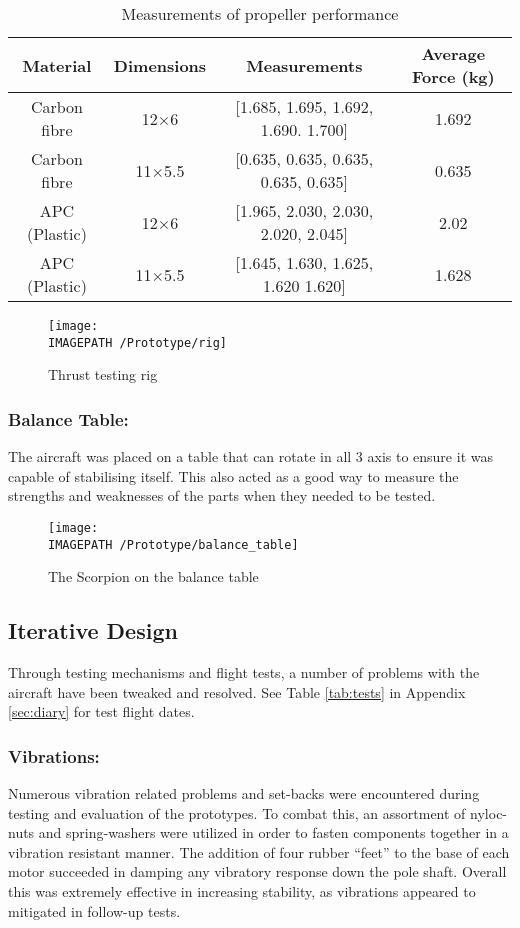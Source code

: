 \begin{table}[!htbp]
	\centering
	\caption{Measurements of propeller performance}
	\begin{tabular}{|c|c|c|c|}
		\hline Material & Dimensions & Measurements & Average Force (kg) \\ 
		\hline Carbon fibre & 12$\times$6 & [1.685, 1.695, 1.692, 1.690. 1.700] & 1.692 \\ 
		\hline Carbon fibre & 11$\times$5.5 & [0.635, 0.635, 0.635, 0.635, 0.635] & 0.635 \\ 
		\hline APC (Plastic) & 12$\times$6 & [1.965, 2.030, 2.030, 2.020, 2.045] & 2.02 \\ 
		\hline APC (Plastic) & 11$\times$5.5 & [1.645, 1.630, 1.625, 1.620 1.620] & 1.628 \\ 
		\hline 
	\end{tabular} 
	\label{tab:props}
\end{table}

\begin{figure}[!ht]
	\centering
	\texttt{[image: \\IMAGEPATH /Prototype/rig]}
	\caption{Thrust testing rig}
	\label{fig:rig}
\end{figure}



\subsubsection*{Balance Table:} The aircraft was placed on a table that can rotate in all 3 axis to ensure it was capable of stabilising itself. This also acted as a good way to measure the strengths and weaknesses of the parts when they needed to be tested. 

\begin{figure}[!ht]
	\centering
	\texttt{[image: \\IMAGEPATH /Prototype/balance\_table]}
	\caption{The Scorpion on the balance table}
	\label{fig:balance_table}
\end{figure}


\subsection{Iterative Design}
Through testing mechanisms and flight tests, a number of problems with the aircraft have been tweaked and resolved. See Table \ref{tab:tests} in Appendix \ref{sec:diary} for test flight dates.

\subsubsection*{Vibrations:} Numerous vibration related problems and set-backs were encountered during testing and evaluation of the prototypes. To combat this, an assortment of nyloc-nuts and spring-washers were utilized in order to fasten components together in a vibration resistant manner. The addition of four rubber ``feet'' to the base of each motor succeeded in damping any vibratory response down the pole shaft. Overall this was extremely effective in increasing stability, as vibrations appeared to mitigated in follow-up tests.

